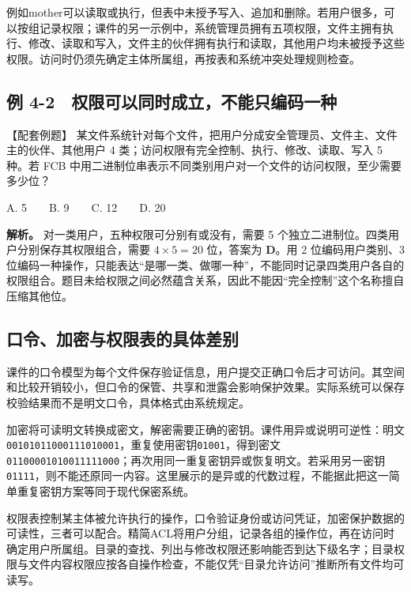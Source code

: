 例如mother可以读取或执行，但表中未授予写入、追加和删除。若用户很多，可以按组记录权限；课件的另一示例中，系统管理员拥有五项权限，文件主拥有执行、修改、读取和写入，文件主的伙伴拥有执行和读取，其他用户均未被授予这些权限。访问时仍须先确定主体所属组，再按表和系统冲突处理规则检查。

\subsection{例 4-2　权限可以同时成立，不能只编码一种}\label{OS04-ex6-2}

\begin{example}[配套例题]

【配套例题】 某文件系统针对每个文件，把用户分成安全管理员、文件主、文件主的伙伴、其他用户 4 类；访问权限有完全控制、执行、修改、读取、写入 5 种。若 FCB 中用二进制位串表示不同类别用户对一个文件的访问权限，至少需要多少位？

A. 5　　B. 9　　C. 12　　D. 20

\end{example}

\textbf{解析。} 对一类用户，五种权限可分别有或没有，需要 5 个独立二进制位。四类用户分别保存其权限组合，需要 \(4\times5=20\) 位，答案为 \textbf{D}。用 2 位编码用户类别、3 位编码一种操作，只能表达``是哪一类、做哪一种''，不能同时记录四类用户各自的权限组合。题目未给权限之间必然蕴含关系，因此不能因``完全控制''这个名称擅自压缩其他位。

\subsection{口令、加密与权限表的具体差别}\label{OS04-protection-methods}

课件的口令模型为每个文件保存验证信息，用户提交正确口令后才可访问。其空间和比较开销较小，但口令的保管、共享和泄露会影响保护效果。实际系统可以保存校验结果而不是明文口令，具体格式由系统规定。

加密将可读明文转换成密文，解密需要正确的密钥。课件用异或说明可逆性：明文\texttt{00101011000111010001}，重复使用密钥\texttt{01001}，得到密文\texttt{01100001010011111000}；再次用同一重复密钥异或恢复明文。若采用另一密钥\texttt{01111}，则不能还原同一内容。这里展示的是异或的代数过程，不能据此把这一简单重复密钥方案等同于现代保密系统。

权限表控制某主体被允许执行的操作，口令验证身份或访问凭证，加密保护数据的可读性，三者可以配合。精简ACL将用户分组，记录各组的操作位，再在访问时确定用户所属组。目录的查找、列出与修改权限还影响能否到达下级名字；目录权限与文件内容权限应按各自操作检查，不能仅凭``目录允许访问''推断所有文件均可读写。

